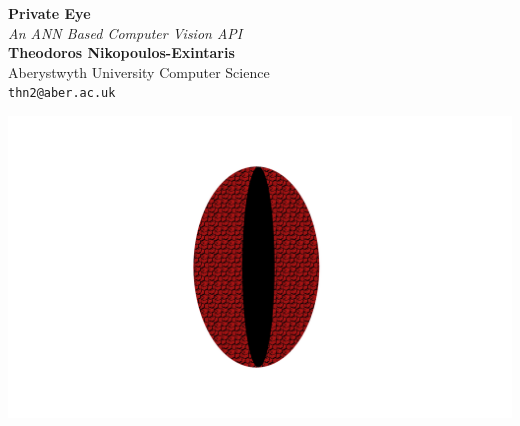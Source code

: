 \documentclass[a0,portrait]{a0poster}
\begin{document}


\begin{minipage}[b]{0.75\linewidth}
\veryHuge \color{NavyBlue} \textbf{Private Eye} \color{Black}\\ %
\Huge\textit{An ANN Based Computer Vision API}\\[2cm] %
\huge \textbf{Theodoros Nikopoulos-Exintaris}\\[0.5cm] %
\huge Aberystwyth University Computer Science\\[0.4cm] %
\Large \texttt{thn2@aber.ac.uk}\\
\end{minipage}
%
\begin{minipage}[b]{0.25\linewidth}
\includegraphics[width=20cm]{logo.png}\\
\end{minipage}

\vspace{1cm} %

\end{document}
